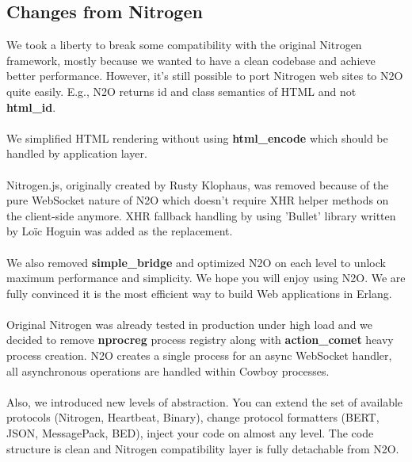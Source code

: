 \subsection*{Changes from Nitrogen}
We took a liberty to break some compatibility with the original
Nitrogen framework, mostly because we wanted to have a clean codebase
and achieve better performance. However, it's still possible to port
Nitrogen web sites to N2O quite easily. E.g., N2O returns id and class semantics
of HTML and not {\bf html\_id}.

\paragraph{}
We simplified HTML rendering without using
{\bf html\_encode} which should be handled by application layer.

\paragraph{}
Nitrogen.js, originally created by Rusty Klophaus, was removed
because of the pure WebSocket nature of N2O which doesn't
require XHR helper methods on the client-side anymore. XHR fallback
handling by using 'Bullet' library written by Loïc Hoguin was added as the replacement.

\paragraph{}
We also removed {\bf simple\_bridge} and optimized N2O on each level to
unlock maximum performance and simplicity. We hope you will enjoy
using N2O. We are fully convinced it is the most efficient way to
build Web applications in Erlang.

\paragraph{}
Original Nitrogen was already tested in production under high load and we
decided to remove {\bf nprocreg} process registry along
with {\bf{action\_comet}} heavy process creation. N2O creates a single
process for an async WebSocket handler, all asynchronous operations
 are handled within Cowboy processes.

\paragraph{}
Also, we introduced new levels of abstraction. You can extend
the set of available protocols (Nitrogen, Heartbeat, Binary), change protocol formatters (BERT,
JSON, MessagePack, BED), inject your code on almost any level. The code structure
is clean and Nitrogen compatibility layer is fully detachable from N2O.
